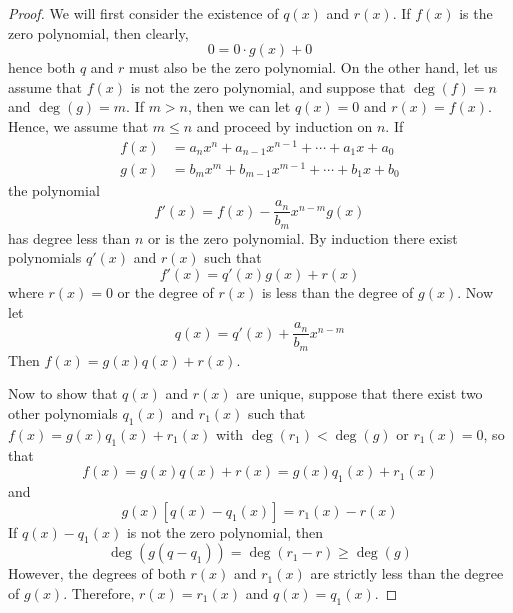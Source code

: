 \documentclass[11pt]{book}
\theoremstyle{definition}\newtheorem{definition}[subsection]{Definition}
\theoremstyle{definition}\newtheorem{example}[subsection]{Example}
\theoremstyle{definition}\newtheorem{notation}[subsection]{Notation}
\theoremstyle{definition}\newtheorem{remark}[subsection]{Remark}
\theoremstyle{theorem}\newtheorem{theorem}[subsection]{Theorem}
\theoremstyle{theorem}\newtheorem{lemma}[subsection]{Lemma}
\theoremstyle{theorem}\newtheorem{proposition}[subsection]{Proposition}
\theoremstyle{theorem}\newtheorem{corollary}[subsection]{Corollary}
\begin{document}
\begin{proof}
    We will first consider the existence of $q(x)$ and $r(x)$. If $f(x)$ is the zero polynomial, then clearly,
    \begin{equation*}
        0 = 0 \cdot g(x) + 0
    \end{equation*}
    hence both $q$ and $r$ must also be the zero polynomial. On the other hand, let us assume that $f(x)$ is not the zero polynomial, and suppose that $\deg(f) = n$ and $\deg(g) = m$. If $m > n$, then we can let $q(x) = 0$ and $r(x) = f(x)$. Hence, we assume that $m \leq n$ and proceed by induction on $n$. If
    \begin{align*}
        f(x) &= a_nx^n + a_{n - 1}x^{n - 1} + \cdots + a_1x + a_0 \\
        g(x) &= b_mx^m + b_{m - 1}x^{m - 1} + \cdots + b_1x + b_0
    \end{align*}
    the polynomial
    \begin{equation*}
        f'(x) = f(x) - \frac{a_n}{b_m}x^{n - m}g(x)
    \end{equation*}
    has degree less than $n$ or is the zero polynomial. By induction there exist polynomials $q'(x)$ and $r(x)$ such that
    \begin{equation*}
        f'(x) = q'(x)g(x) + r(x)
    \end{equation*}
    where $r(x) = 0$ or the degree of $r(x)$ is less than the degree of $g(x)$. Now let
    \begin{equation*}
        q(x) = q'(x) + \frac{a_n}{b_m}x^{n - m}
    \end{equation*}
    Then $f(x) = g(x)q(x) + r(x)$.

    Now to show that $q(x)$ and $r(x)$ are unique, suppose that there exist two other polynomials $q_1(x)$ and $r_1(x)$ such that $f(x) = g(x)q_1(x) + r_1(x)$ with $\deg(r_1) < \deg(g)$ or $r_1(x) = 0$, so that
    \begin{equation*}
        f(x) = g(x)q(x) + r(x) = g(x)q_1(x) + r_1(x)
    \end{equation*}
    and
    \begin{equation*}
        g(x)[q(x) - q_1(x)] = r_1(x) - r(x)
    \end{equation*}
    If $q(x) - q_1(x)$ is not the zero polynomial, then
    \begin{equation*}
        \deg(g(q - q_1)) = \deg(r_1 - r) \geq \deg(g)
    \end{equation*}
    However, the degrees of both $r(x)$ and $r_1(x)$ are strictly less than the degree of $g(x)$. Therefore, $r(x) = r_1(x)$ and $q(x) = q_1(x)$.
\end{proof}
\end{document}
